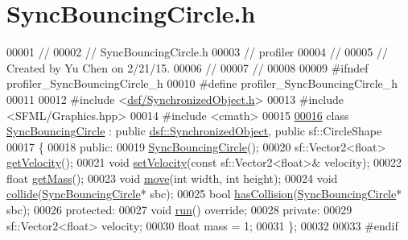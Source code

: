 \hypertarget{_sync_bouncing_circle_8h_source}{}\section{Sync\+Bouncing\+Circle.\+h}
\label{_sync_bouncing_circle_8h_source}

\begin{DoxyCode}
00001 \textcolor{comment}{//}
00002 \textcolor{comment}{//  SyncBouncingCircle.h}
00003 \textcolor{comment}{//  profiler}
00004 \textcolor{comment}{//}
00005 \textcolor{comment}{//  Created by Yu Chen on 2/21/15.}
00006 \textcolor{comment}{//}
00007 \textcolor{comment}{//}
00008 
00009 \textcolor{preprocessor}{#ifndef profiler\_SyncBouncingCircle\_h}
00010 \textcolor{preprocessor}{#define profiler\_SyncBouncingCircle\_h}
00011 
00012 \textcolor{preprocessor}{#include <\hyperlink{_synchronized_object_8h}{dsf/SynchronizedObject.h}>}
00013 \textcolor{preprocessor}{#include <SFML/Graphics.hpp>}
00014 \textcolor{preprocessor}{#include <cmath>}
00015 
\hypertarget{_sync_bouncing_circle_8h_source_l00016}{}\hyperlink{class_sync_bouncing_circle}{00016} \textcolor{keyword}{class }\hyperlink{class_sync_bouncing_circle}{SyncBouncingCircle} : \textcolor{keyword}{public} \hyperlink{classdsf_1_1_synchronized_object}{dsf::SynchronizedObject}, \textcolor{keyword}{public} 
      sf::CircleShape
00017 \{
00018 \textcolor{keyword}{public}:
00019     \hyperlink{class_sync_bouncing_circle_aa00f50414fddd97cbb14fe702fa201e2}{SyncBouncingCircle}();
00020     sf::Vector2<float> \hyperlink{class_sync_bouncing_circle_a53ee06bdeb5025dfd42a49c385e5a1c0}{getVelocity}();
00021     \textcolor{keywordtype}{void} \hyperlink{class_sync_bouncing_circle_a1e732f9061d50b87b227f7b57b3834bd}{setVelocity}(\textcolor{keyword}{const} sf::Vector2<float>& velocity);
00022     \textcolor{keywordtype}{float} \hyperlink{class_sync_bouncing_circle_ae9682f881b9bcb70450ae6546f3f28a3}{getMass}();
00023     \textcolor{keywordtype}{void} \hyperlink{class_sync_bouncing_circle_a6c3d0788f0efb17e457f1a7d9500643b}{move}(\textcolor{keywordtype}{int} width, \textcolor{keywordtype}{int} height);
00024     \textcolor{keywordtype}{void} \hyperlink{class_sync_bouncing_circle_a30bf8948d5c62d34d9f403228571886b}{collide}(\hyperlink{class_sync_bouncing_circle}{SyncBouncingCircle}* sbc);
00025     \textcolor{keywordtype}{bool} \hyperlink{class_sync_bouncing_circle_ab4c66394f5604d08cc1c1738f33376b5}{hasCollision}(\hyperlink{class_sync_bouncing_circle}{SyncBouncingCircle}* sbc);
00026 \textcolor{keyword}{protected}:
00027     \textcolor{keywordtype}{void} \hyperlink{class_sync_bouncing_circle_a65add49b37f08c7c2c1ab24fc2251f5a}{run}() \textcolor{keyword}{override};
00028 \textcolor{keyword}{private}:
00029     sf::Vector2<float> velocity;
00030     \textcolor{keywordtype}{float} mass = 1;
00031 \};
00032 
00033 \textcolor{preprocessor}{#endif}
\end{DoxyCode}
